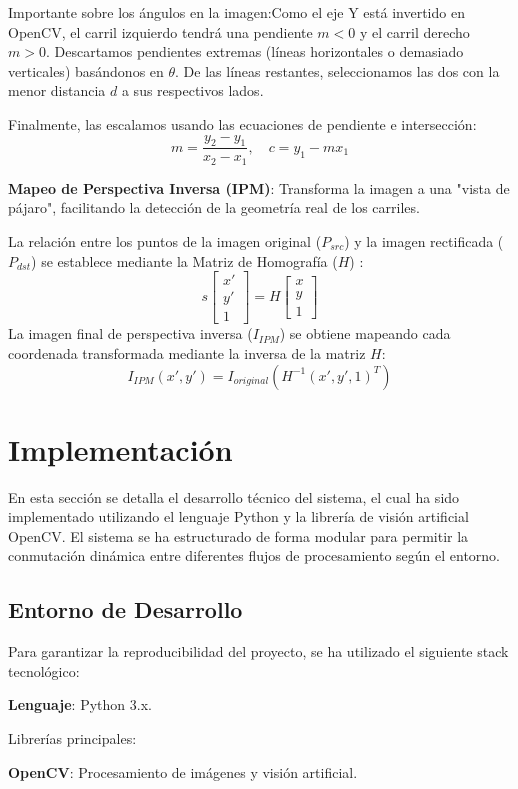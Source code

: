 \documentclass{article}
\begin{document}
Importante sobre los ángulos en la imagen:Como el eje Y está invertido en OpenCV, el carril izquierdo tendrá una pendiente $m < 0$ y el carril derecho $m > 0$. Descartamos pendientes extremas (líneas horizontales o demasiado verticales) basándonos en $\theta$. De las líneas restantes, seleccionamos las dos con la menor distancia $d$ a sus respectivos lados.

Finalmente, las escalamos usando las ecuaciones de pendiente e intersección:
$$m = \frac{y_2 - y_1}{x_2 - x_1}, \quad c = y_1 - mx_1$$

\textbf{Mapeo de Perspectiva Inversa (IPM)}: Transforma la imagen a una "vista de pájaro", facilitando la detección de la geometría real de los carriles.

La relación entre los puntos de la imagen original ($P_{src}$) y la imagen rectificada ($P_{dst}$) se establece mediante la Matriz de Homografía ($H$) :$$s \begin{bmatrix} x' \\ y' \\ 1 \end{bmatrix} = H \begin{bmatrix} x \\ y \\ 1 \end{bmatrix}$$La imagen final de perspectiva inversa ($I_{IPM}$) se obtiene mapeando cada coordenada transformada mediante la inversa de la matriz $H$:$$I_{IPM}(x', y') = I_{original}(H^{-1}(x', y', 1)^T)$$


\section{Implementación}
En esta sección se detalla el desarrollo técnico del sistema, el cual ha sido implementado utilizando el lenguaje Python y la librería de visión artificial OpenCV. El sistema se ha estructurado de forma modular para permitir la conmutación dinámica entre diferentes flujos de procesamiento según el entorno.
\subsection{Entorno de Desarrollo}
Para garantizar la reproducibilidad del proyecto, se ha utilizado el siguiente stack tecnológico:

\textbf{Lenguaje}: Python 3.x.

Librerías principales:

\textbf{OpenCV}: Procesamiento de imágenes y visión artificial.
\end{document}
